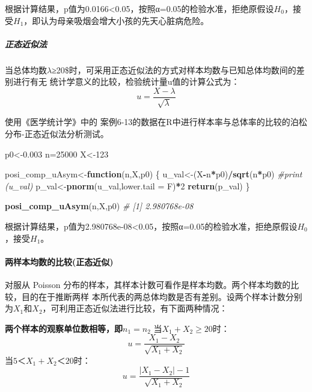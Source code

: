 \documentclass[
]{article}
\newenvironment{Shaded}{\begin{snugshade}}{\end{snugshade}}
\newcommand{\CommentTok}[1]{\textcolor[rgb]{0.56,0.35,0.01}{\textit{#1}}}
\newcommand{\ControlFlowTok}[1]{\textcolor[rgb]{0.13,0.29,0.53}{\textbf{#1}}}
\newcommand{\DataTypeTok}[1]{\textcolor[rgb]{0.13,0.29,0.53}{#1}}
\newcommand{\DecValTok}[1]{\textcolor[rgb]{0.00,0.00,0.81}{#1}}
\newcommand{\FloatTok}[1]{\textcolor[rgb]{0.00,0.00,0.81}{#1}}
\newcommand{\KeywordTok}[1]{\textcolor[rgb]{0.13,0.29,0.53}{\textbf{#1}}}
\newcommand{\NormalTok}[1]{#1}
\newcommand{\OperatorTok}[1]{\textcolor[rgb]{0.81,0.36,0.00}{\textbf{#1}}}
\begin{document}
根据计算结果，p值为0.0166\textless0.05，按照α=0.05的检验水准，拒绝原假设\(H_0\)，接受\(H_1\)，即认为母亲吸烟会增大小孩的先天心脏病危险。

\hypertarget{ux6b63ux6001ux8fd1ux4f3cux6cd5-3}{%
\subparagraph{正态近似法}\label{ux6b63ux6001ux8fd1ux4f3cux6cd5-3}}

当总体均数\(\lambda\)≥20\$时，可采用正态近似法的方式对样本均数与已知总体均数间的差别进行有无
统计学意义的比较，检验统计量u值的计算公式为：
\[u=\frac{X-\lambda}{\sqrt{\lambda}}\]

使用《医学统计学》中的 案例6-13的数据在R中进行样本率与总体率的比较的泊松分布-正态近似法分析测试。

\begin{Shaded}
\begin{Highlighting}[]
\NormalTok{p0<-}\FloatTok{0.003}
\NormalTok{n=}\DecValTok{25000}
\NormalTok{X<-}\DecValTok{123}

\NormalTok{posi_comp_uAsym<-}\ControlFlowTok{function}\NormalTok{(n,X,p0) \{}
\NormalTok{  u_val<-(X}\OperatorTok{-}\NormalTok{n}\OperatorTok{*}\NormalTok{p0)}\OperatorTok{/}\KeywordTok{sqrt}\NormalTok{(n}\OperatorTok{*}\NormalTok{p0)}
  \CommentTok{#print (u_val)}
\NormalTok{  p_val<-}\KeywordTok{pnorm}\NormalTok{(u_val,}\DataTypeTok{lower.tail =}\NormalTok{ F)}\OperatorTok{*}\DecValTok{2}
  \KeywordTok{return}\NormalTok{(p_val)}
\NormalTok{\}}

\KeywordTok{posi_comp_uAsym}\NormalTok{(n,X,p0)}
\CommentTok{# [1] 2.980768e-08}
\end{Highlighting}
\end{Shaded}

根据计算结果，p值为2.980768e-08\textless0.05，按照α=0.05的检验水准，拒绝原假设\(H_0\)，接受\(H_1\)。

\hypertarget{ux4e24ux6837ux672cux5747ux6570ux7684ux6bd4ux8f83ux6b63ux6001ux8fd1ux4f3c}{%
\paragraph{两样本均数的比较(正态近似)}\label{ux4e24ux6837ux672cux5747ux6570ux7684ux6bd4ux8f83ux6b63ux6001ux8fd1ux4f3c}}

对服从 Poisson 分布的样本，其样本计数可看作是样本均数。两个样本均数的比较，目的在于推断两样
本所代表的两总体均数是否有差别。设两个样本计数分别为\(X_1\)和\(X_2\)，可利用正态近似法进行比较，有下面两种情况：

\textbf{两个样本的观察单位数相等，即\(n_1=n_2\)}
当\(X_1+X_2≥20\)时：
\[u=\frac{X_1-X_2}{\sqrt{X_1+X_2}}\]
当\(5＜X_1+X_2＜20\)时：
\[u=\frac{|X_1-X_2|-1}{\sqrt{X_1+X_2}}\]
\end{document}
